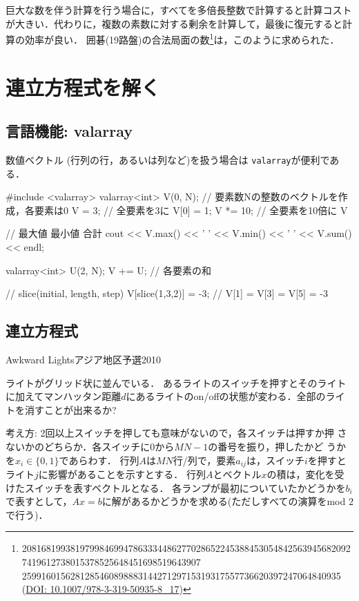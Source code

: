 \begin{versionbeta}
巨大な数を伴う計算を行う場合に，すべてを多倍長整数で計算すると計算コストが大きい．代わりに，複数の素数に対する剰余を計算して，最後に復元すると計算の効率が良い．
囲碁(19路盤)の合法局面の数\footnote{208168199381979984699478633344862770286522453884530548425639456820927419612738015378525648451698519643907
259916015628128546089888314427129715319317557736620397247064840935 (\url{DOI: 10.1007/978-3-319-50935-8_17})}は，このように求められた．


\section{連立方程式を解く}

\subsection{言語機能: valarray}

数値ベクトル (行列の行，あるいは列など)を扱う場合は \texttt{valarray}が便利である．

\begin{cbox}
#include <valarray>
valarray<int> V(0, N);  // 要素数Nの整数のベクトルを作成，各要素は0
V = 3; // 全要素を3に
V[0] = 1;
V *= 10; // 全要素を10倍に
V 

// 最大値 最小値 合計
cout << V.max() << ' ' << V.min() << ' ' << V.sum() << endl;

valarray<int> U(2, N);
V += U; // 各要素の和

// slice(initial, length, step)
V[slice(1,3,2)] = -3; // V[1] = V[3] = V[5] = -3
\end{cbox}

\subsection{連立方程式}

\begin{pbox}{Awkward Lights}{アジア地区予選2010}

ライトがグリッド状に並んでいる．
あるライトのスイッチを押すとそのライトに加えてマンハッタン距離$d$にあるライトのon/offの状態が変わる．全部のライトを消すことが出来るか?


\end{pbox}

考え方: 2回以上スイッチを押しても意味がないので，各スイッチは押すか押
さないかのどちらか．各スイッチに$0$から$MN-1$の番号を振り，押したかど
うかを$x_i \in \{0,1\}$であらわす．
行列$A$は$MN$行/列で，要素$a_{ij}$は，スイッチ$i$を押すとライト$j$に影響があることを示すとする．
行列$A$とベクトル$x$の積は，変化を受けたスイッチを表すベクトルとなる．
各ランプが最初についていたかどうかを$b_i$で表すとして，$Ax = b$に解があるかどうかを求める(ただしすべての演算をmod $2$で行う)．


\end{versionbeta}

